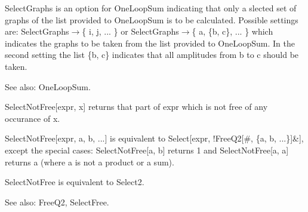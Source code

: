 





SelectGraphs is an option for OneLoopSum indicating that only a slected set of graphs of the list provided to OneLoopSum is to be
  calculated. Possible settings are: SelectGraphs\(\rightarrow \)\{ i, j, { }... \} or SelectGraphs\(\rightarrow \)\{ a, \{b, c\}, ... \}
  which indicates the graphs to be taken from the list provided to OneLoopSum. In the second setting the list \{b, c\} indicates that all
  amplitudes from b to c should be taken.

See also:  OneLoopSum.



SelectNotFree[expr, x] returns that part of expr which is not free of any occurance of x.

SelectNotFree[expr, a, b, ...] is equivalent to Select[expr, !FreeQ2[\#{}, \{a, b, ...\}]\&{}], except the special cases:
  SelectNotFree[a, b] returns 1 and SelectNotFree[a, a] returns a (where a is not a product or a sum).

SelectNotFree is equivalent to Select2.

See also:  FreeQ2, SelectFree.











